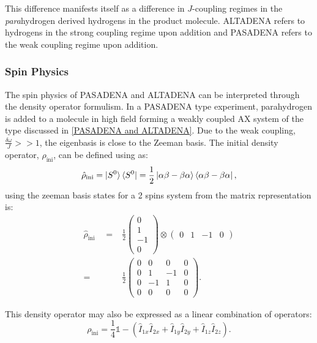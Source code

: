  This difference manifests itself as a difference in $J$-coupling regimes in the \textit{para}hydrogen derived hydrogens in
 the product molecule. ALTADENA refers to hydrogens in the strong coupling regime upon addition and PASADENA refers to the weak coupling regime
 upon addition.


 \subsubsection{Spin Physics}

 The spin physics of PASADENA and ALTADENA can be interpreted through the density operator formulism. In a
 PASADENA type experiment, parahydrogen is added to a molecule in high field forming a weakly coupled AX
 system of the type discussed in \ref{PASADENA and ALTADENA}. Due to the weak coupling, $\frac{\delta{\omega}}{J}>>1$, the eigenbasis is close to the
 Zeeman basis. The initial density operator, $\hat{\rho}_{\text{ini}}$, can be defined using
  as:
 \begin{equation}
   \hat{\rho}_{\text{ini}} = \ket{S^0}\bra{S^0} = \frac{1}{2}\ket{\alpha\beta -
   \beta\alpha}\bra{\alpha\beta - \beta\alpha},
 \end{equation}
 using the zeeman basis states for a 2 spins system from  the
 matrix representation is:
 \begin{align}
   \hat{\rho}_{\text{ini}}\quad=& \frac{1}{2} \begin{pmatrix}
   0\\
   1\\
   -1\\
   0
   \end{pmatrix} \otimes \begin{pmatrix}
     0 & 1 & -1 & 0
     \end{pmatrix}\\
   =& \frac{1}{2}\begin{pmatrix}
   0 & 0 & 0 & 0\\
   0 & 1 & -1 & 0\\
   0 & -1 & 1 & 0\\
   0 & 0 & 0 & 0
 \end{pmatrix}.
 \end{align}

This density operator may also be expressed as a linear combination of operators:
\begin{equation}
  \rho_{\text{ini}} = \frac{1}{4}\mathbb{1} - (\hat{I}_{1x}\hat{I}_{2x} + \hat{I}_{1y}\hat{I}_{2y} + \hat{I}_{1z}\hat{I}_{2z}).
\end{equation}

